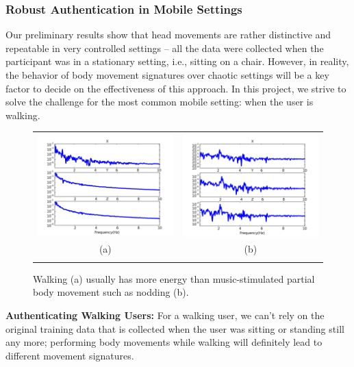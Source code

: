 \subsubsection{Robust Authentication in Mobile Settings}
Our preliminary results show that head movements are rather distinctive and repeatable in very controlled settings -- all the data were collected when the participant was in a stationary setting, i.e., sitting on a chair. However, in reality, the behavior of body movement signatures over chaotic settings will be a key factor to decide on the effectiveness of this approach. In this project, we strive to solve the challenge for the most common mobile setting: when the user is walking.


\begin{figure}\centering
\begin{tabular}{cc}
\includegraphics[width=0.50\linewidth]{../figure/sub1_walking_freq} &
\includegraphics[width=0.50\linewidth]{../figure/sub1_nodding_freq} \\
(a) & (b) \\
\vspace{-4pt}
\end{tabular}
    \caption{\label{fig:walk} Walking (a) usually has more energy than music-stimulated partial body movement such as nodding (b).}
\vspace{-6pt}
\end{figure}
\vspace{4pt}\textbf{Authenticating Walking Users:}  For a walking user, we can't rely on the original training data that is collected when the user was sitting or standing still any more; performing body movements while walking will definitely lead to different movement signatures.

